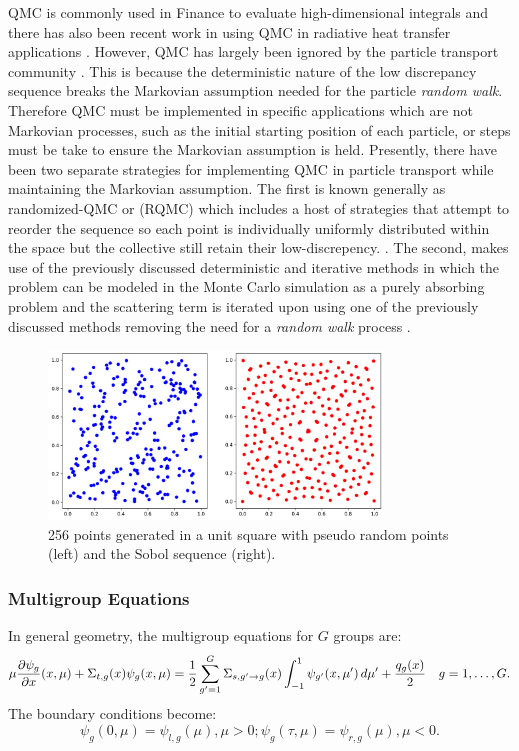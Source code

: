 QMC is commonly used in Finance to evaluate high-dimensional integrals \cite{Dagpunar2007} and there has also been recent work in using QMC in radiative heat transfer applications \cite{MOROKOFF1993, Palluotto2019}. However, QMC has largely been ignored by the particle transport community \cite{Spanier1995}. This is because the deterministic nature of the low discrepancy sequence breaks the Markovian assumption needed for the particle \textit{random walk}. Therefore QMC must be implemented in specific applications which are not Markovian processes, such as the initial starting position of each particle, or steps must be take to ensure the Markovian assumption is held. Presently, there have been two separate strategies for implementing QMC in particle transport while maintaining the Markovian assumption. The first is known generally as randomized-QMC or (RQMC) which includes a host of strategies that attempt to reorder the sequence so each point is individually uniformly distributed within the space but the collective still retain their low-discrepency. \cite{Fox1999, Spanier1995, Farmer2020, MOROKOFF1993, Konzen2019}. The second, makes use of the previously discussed  deterministic and iterative methods in which the problem can be modeled in the Monte Carlo simulation as a purely absorbing problem and the scattering term is iterated upon using one of the previously discussed methods removing the need for a \textit{random walk} process \cite{Pasmann2021}.

\begin{figure}[h]
\centerline{
\includegraphics[width=3.5in]{FIGURES/sobol.png}
}
\caption{\label{fig:sobol} 256 points generated in a unit square with pseudo random points (left) and the Sobol sequence (right).}
\end{figure}


\subsubsection{Multigroup Equations}

In general geometry, the multigroup equations for $G$ groups are:
\begin{equation}\label{eq:MG}
\mu  \frac{\partial \psi_g}{\partial x} (x,\mu) + \Sigma_{t,g}(x) \psi_g(x,\mu) =
\frac{1}{2} \sum_{g'=1}^G \Sigma_{s,g'\rightarrow g}(x) \int_{-1}^1 \psi_{g'}(x, \mu') \, d\mu' + \frac{q_g(x)}{2} \quad g=1,\dots,G.
\end{equation}The boundary conditions become:
\[
\psi_g(0, \mu) = \psi_{l,g}(\mu), \mu > 0; \psi_g(\tau, \mu) = \psi_{r,g}(\mu),
\mu < 0.
\]

